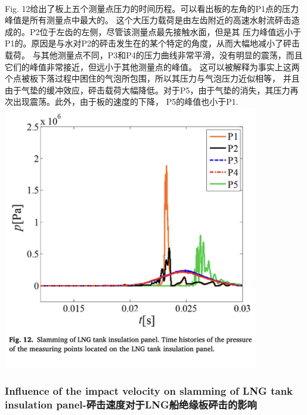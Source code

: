 \documentclass[UTF8]{ctexart}
\begin{document}
\paragraph{\quad}Fig. 12给出了板上五个测量点压力的时间历程。可以看出板的左角的P1点的压力峰值是所有测量点中最大的。
                这个大压力载荷是由左齿附近的高速水射流砰击造成的。P2位于左齿的左侧，尽管该测量点最先接触水面，但是其
                压力峰值远小于P1的。原因是与水对P2的砰击发生在的某个特定的角度，从而大幅地减小了砰击载荷。
                与其他测量点不同，P3和P4的压力曲线非常平滑，没有明显的震荡，而且它们的峰值非常接近，但远小于其他测量点的峰值。
                这可以被解释为事实上这两个点被板下落过程中困住的气泡所包围，所以其压力与气泡压力近似相等，
                并且由于气垫的缓冲效应，砰击载荷大幅降低。对于P5，由于气垫的消失，其压力再次出现震荡。此外，由于板的速度的下降，
                P5的峰值也小于P1.\\
{
    \centering
    \includegraphics[width=30em]{./source/Fig12.png}
}
\subsubsection{Influence of the impact velocity on slamming of LNG tank insulation panel-砰击速度对于LNG船绝缘板砰击的影响}
\end{document}
